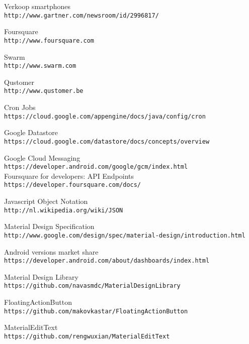 \begin{thebibliography}{9}

Verkoop smartphones
\\\texttt{http://www.gartner.com/newsroom/id/2996817/}

Foursquare
\\\texttt{http://www.foursquare.com}

Swarm
\\\texttt{http://www.swarm.com}

Qustomer
\\\texttt{http://www.qustomer.be}

Cron Jobs
\\\texttt{https://cloud.google.com/appengine/docs/java/config/cron}

Google Datastore
\\\texttt{https://cloud.google.com/datastore/docs/concepts/overview}

Google Cloud Messaging
\\\texttt{https://developer.android.com/google/gcm/index.html}
\\

Foursquare for developers: API Endpoints
\\\texttt{https://developer.foursquare.com/docs/}

Javascript Object Notation
\\\texttt{http://nl.wikipedia.org/wiki/JSON}

Material Design Specification
\\\texttt{http://www.google.com/design/spec/material-design/introduction.html}

Android versions market share
\\\texttt{https://developer.android.com/about/dashboards/index.html}

Material Design Library
\\\texttt{https://github.com/navasmdc/MaterialDesignLibrary}

FloatingActionButton
\\\texttt{https://github.com/makovkastar/FloatingActionButton}

MaterialEditText
\\\texttt{https://github.com/rengwuxian/MaterialEditText}


\end{thebibliography}
